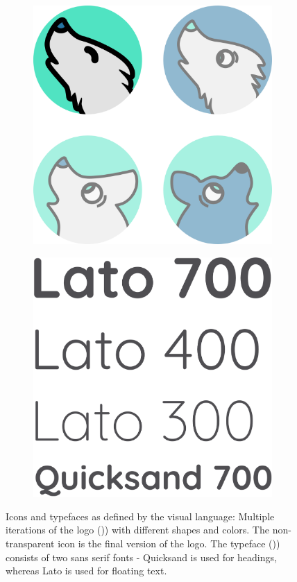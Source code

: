 \documentclass[12pt,numbers=noenddot,parskip,bibliography=totocnumbered,listof=totocnumbered,draft]{scrreprt}
\begin{document}
\begin{figure}
\begin{subfigure}[t]{0.45\textwidth}
\centering
\includegraphics[width=\linewidth]{icons.png}
\caption{}
\label{icons}
\end{subfigure}
\hfill
\begin{subfigure}[t]{0.45\textwidth}
\centering
\includegraphics[width=\linewidth]{fonts.png}
\caption{}
\label{fonts}
\end{subfigure}
\caption[Icons and typefaces]{Icons and typefaces as defined by the visual language: Multiple iterations of the logo ()) with different shapes and colors. The non-transparent icon is the final version of the logo. The typeface ()) consists of two sans serif fonts - Quicksand is used for headings, whereas Lato is used for floating text.}
\end{figure}
\end{document}
